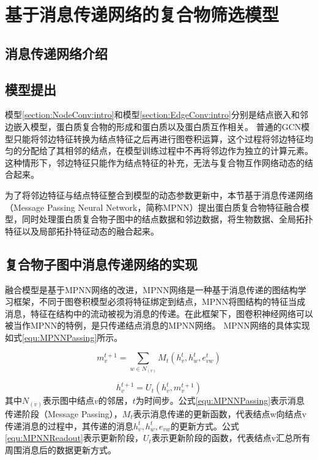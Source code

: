 \chapter{基于消息传递网络的复合物筛选模型}
\label{chapter:MPNN}

\section{消息传递网络介绍}
\label{section:MPNN:intro}

\section{模型提出}
\label{section:MPNN:Put}

模型\ref{section:NodeConv:intro}和模型\ref{section:EdgeConv:intro}分别是结点嵌入和邻边嵌入模型，蛋白质复合物的形成和蛋白质以及蛋白质互作相关。
普通的GCN模型只能将邻边特征转换为结点特征之后再进行图卷积运算，这个过程将邻边特征均匀的分配给了其相邻的结点，在模型训练过程中不再将邻边作为独立的计算元素。这种情形下，邻边特征只能作为结点特征的补充，无法与复合物互作网络动态的结合起来。

为了将邻边特征与结点特征整合到模型的动态参数更新中，本节基于消息传递网络（Message Passing Neural Network，简称MPNN）提出蛋白质复合物特征融合模型，同时处理蛋白质复合物子图中的结点数据和邻边数据，将生物数据、全局拓扑特征以及局部拓扑特征动态的融合起来。

\section{复合物子图中消息传递网络的实现}
\label{section:MPNN:detail}

融合模型是基于MPNN网络的改进，MPNN网络是一种基于消息传递的图结构学习框架，不同于图卷积模型必须将特征绑定到结点，MPNN将图结构的特征当成消息，特征在结构中的流动被视为消息的传递。在此框架下，图卷积神经网络可以被当作MPNN的特例，是只传递结点消息的MPNN网络。
MPNN网络的具体实现如式\ref{equ:MPNNPassing}所示。

\begin{equation}
    \label{equ:MPNNPassing}
    m_v^{t+1} = \sum_{w \in N_{(v)}}M_t(h_v^t,h_w^t,e_{vw}^t)
\end{equation}

\begin{equation}
    \label{equ:MPNNReadout}
    h_v^{t+1} = U_t(h_v^t,m_v^{t+1})
\end{equation}
其中$N_{(v)}$表示图中结点$v$的邻居，$t$为时间步。公式\ref{equ:MPNNPassing}表示消息传递阶段（Message Passing），$M_t$表示消息传递的更新函数，代表结点w向结点v传递消息的过程中，其传递的消息$h_v^t,h_w^t,e_{vw}$的更新方式。公式\ref{equ:MPNNReadout}表示更新阶段，$U_t$表示更新阶段的函数，代表结点v汇总所有周围消息后的数据更新方式。

